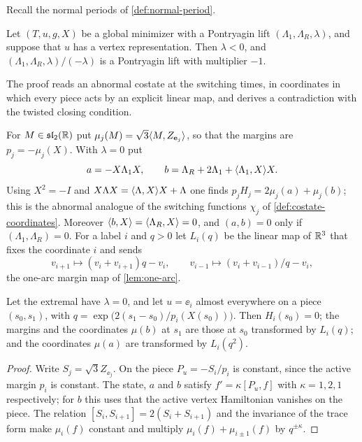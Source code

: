 Recall the normal periods of \cref{def:normal-period}.

\begin{theorem}[Normality]\label{thm:normality}
Let $(T,u,g,X)$ be a global minimizer with a Pontryagin lift $(\Lambda_1,\Lambda_R,\lambda)$, and
suppose that $u$ has a vertex representation. Then $\lambda<0$, and
$(\Lambda_1,\Lambda_R,\lambda)/(-\lambda)$ is a Pontryagin lift with multiplier $-1$.
\end{theorem}

The proof reads an abnormal costate at the switching times, in coordinates in which every piece
acts by an explicit linear map, and derives a contradiction with the twisted closing condition.

 For $M\in\mathfrak{sl}_2(\mathbb{R})$ put $\mu_j(M)=\sqrt3\langle M,Z_{\mathbf{e}_j}\rangle$, so that the margins
are $p_j=-\mu_j(X)$. With $\lambda=0$ put
\[
a=-X\Lambda_1X,\qquad b=\Lambda_R+2\Lambda_1+\langle \Lambda_1,X\rangle X.
\]
Using $X^2=-I$ and $X\Lambda X=\langle \Lambda,X\rangle X+\Lambda$ one finds
$p_jH_j=2\mu_j(a)+\mu_j(b)$; this is the abnormal
analogue of the switching functions $\chi_j$ of \cref{def:costate-coordinates}. Moreover
$\langle b,X\rangle=\langle \Lambda_R,X\rangle=0$, and $(a,b)=0$ only if $(\Lambda_1,\Lambda_R)=0$. For a label $i$
and $q>0$ let $L_i(q)$ be the linear map of $\mathbb{R}^3$ that fixes the coordinate $i$ and sends
\[
v_{i+1}\mapsto(v_i+v_{i+1})q-v_i,\qquad v_{i-1}\mapsto(v_i+v_{i-1})/q-v_i,
\]
the one-arc margin map of \cref{lem:one-arc}.

\begin{lemma}\label{red:abnormal-transport}
Let the extremal have $\lambda=0$, and let $u=\ee_i$ almost everywhere on a piece $(s_0,s_1)$, with
$q=\exp\bigl(2(s_1-s_0)/p_i(X(s_0))\bigr)$. Then $H_i(s_0)=0$; the margins and the coordinates
$\mu(b)$ at $s_1$ are those at $s_0$ transformed by $L_i(q)$; and the coordinates $\mu(a)$ are
transformed by $L_i(q^2)$.
\end{lemma}

\begin{proof}
Write $S_j=\sqrt3Z_{\ee_j}$. On the piece $P_u=-S_i/p_i$ is constant, since the active margin
$p_i$ is constant. The state, $a$ and $b$ satisfy $f'=\kappa[P_u,f]$ with $\kappa=1,2,1$
respectively; for $b$ this uses that the active vertex Hamiltonian vanishes on the piece. The
relation $[S_i,S_{i+1}]=2(S_i+S_{i+1})$ and the invariance of the trace form make $\mu_i(f)$
constant and multiply $\mu_i(f)+\mu_{i\pm1}(f)$ by $q^{\pm\kappa}$.
\end{proof}

